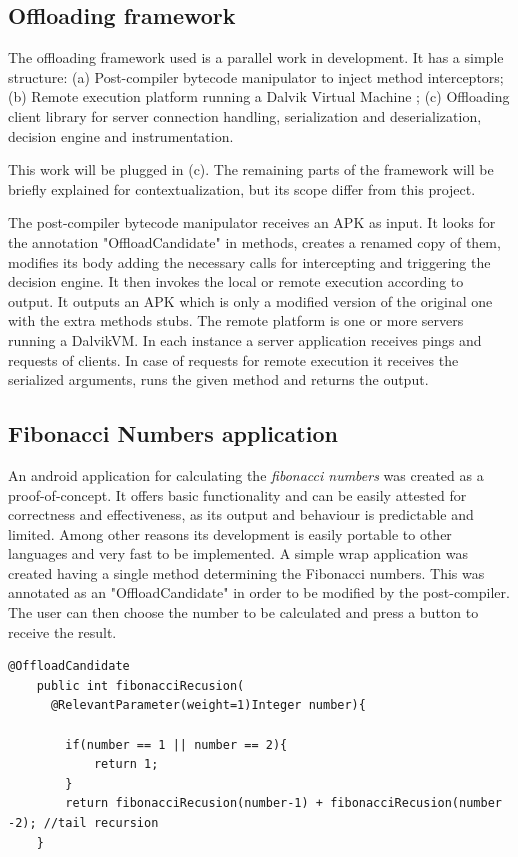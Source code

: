 \documentclass[10pt, conference, letterpaper]{IEEEtran}
\begin{document}
  \subsection{Offloading framework}
  The offloading framework used is a parallel work in development. It has a simple structure: (a) Post-compiler bytecode manipulator to inject method interceptors; (b) Remote execution platform running a Dalvik Virtual Machine \cite{ehringer2010dalvik}; (c) Offloading client library for server connection handling, serialization and deserialization, decision engine and instrumentation.

  This work will be plugged in (c). The remaining parts of the framework will be briefly explained for contextualization, but its scope differ from this project.

  The post-compiler bytecode manipulator receives an APK as input. It looks for the annotation "OffloadCandidate" in methods, creates a renamed copy of them, modifies its body adding the necessary calls for intercepting and triggering the decision engine. It then invokes the local or remote execution according to output. It outputs an APK which is only a modified version of the original one with the extra methods stubs. The remote platform is one or more servers running a DalvikVM. In each instance a server application receives pings and requests of clients. In case of requests for remote execution it receives the serialized arguments, runs the given method and returns the output.

  \subsection{Fibonacci Numbers application}
  An android application for calculating the \textit{fibonacci numbers} was created as a proof-of-concept. It offers basic functionality and can be easily attested for correctness and effectiveness, as its output and behaviour is predictable and limited. Among other reasons its development is easily portable to other languages and very fast to be implemented. A simple wrap application was created having a single method determining the Fibonacci numbers. This was annotated as an "OffloadCandidate" in order to be modified by the post-compiler. The user can then choose the number to be calculated and press a button to receive the result.

  \begin{lstlisting}[caption=Fibonacci Numbers calculation, label=lst:fibonacci]
	@OffloadCandidate
	public int fibonacciRecusion(
      @RelevantParameter(weight=1)Integer number){

        if(number == 1 || number == 2){
            return 1;
        } 
        return fibonacciRecusion(number-1) + fibonacciRecusion(number -2); //tail recursion
    }
  \end{lstlisting}
\end{document}
